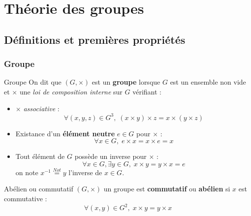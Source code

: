 \chapter{Théorie des groupes} %
\label{chap:Théorie des groupes}


\section{Définitions et premières propriétés} %
\label{sec:Définitions et premières propriétés}

\subsection{Groupe} %
\label{sub:Groupe}

\begin{Definition}[colbacktitle=red!75!black]{Groupe}{}
On dit que $(G, \times)$ est un \textbf{groupe} lorsque $G$ est un ensemble non vide et $\times$ une \textit{loi de composition interne} sur $G$ vérifiant : 
\begin{itemize}

    \item $\times$ \textit{associative} : 
      \begin{equation}
        \forall ( x, y, z) \in G ^{3}, \; (x \times y )\times z = x \times (y \times z) 
      \end{equation} 
    \item Existance d'un \textbf{élément neutre} $e \in G$ pour $\times$ : 
      \begin{equation}
        \forall x \in  G, \; e \times x = x \times e = x
      \end{equation}

    \item Tout élément de $G$ possède un inverse pour $\times$ : 
      \begin{equation}
        \forall x \in G, \exists y \in G,\; x \times y = y \times x = e
      \end{equation}
      on note $x ^{-1} \overset{Not}{=} y$ l'inverse de $x \in G$.

\end{itemize}
\end{Definition}

\begin{Definition}[colbacktitle=red!75!black]{Abélien ou commutatif}{}
$(G, \times)$ un groupe est \textbf{commutatif} ou \textbf{abélien} si $x$ est commutative : 
\begin{equation}
  \forall (x,y) \in G ^{2}, \; x \times y = y \times x
\end{equation}
\end{Definition}



